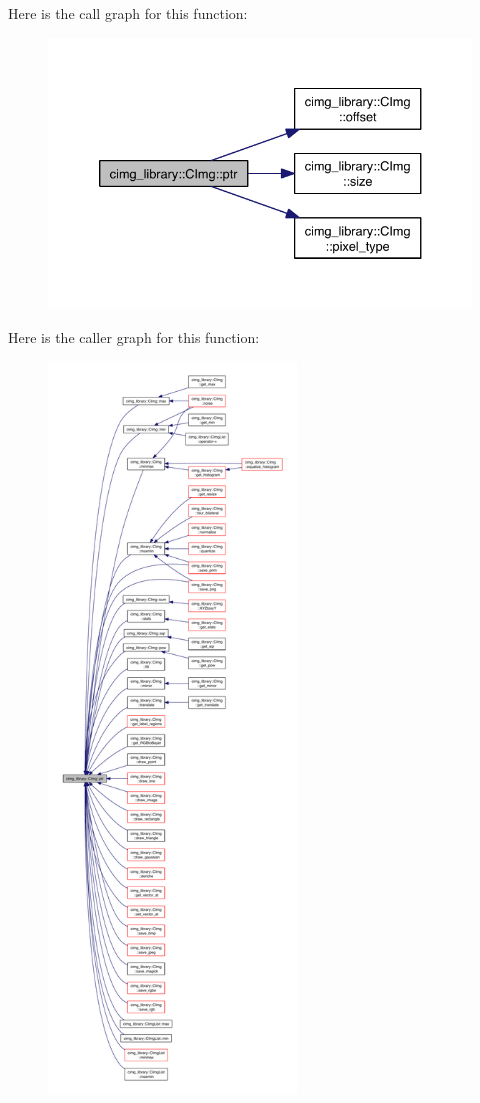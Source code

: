 Here is the call graph for this function\-:
\nopagebreak
\begin{figure}[H]
\begin{center}
\leavevmode
\includegraphics[width=334pt]{structcimg__library_1_1_c_img_af19c37d44b9fce37ad7c4a9ad247d1a0_cgraph}
\end{center}
\end{figure}




Here is the caller graph for this function\-:
\nopagebreak
\begin{figure}[H]
\begin{center}
\leavevmode
\includegraphics[height=550pt]{structcimg__library_1_1_c_img_af19c37d44b9fce37ad7c4a9ad247d1a0_icgraph}
\end{center}
\end{figure}


